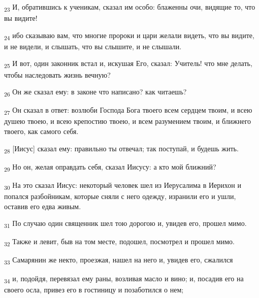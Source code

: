 \begin{tcolorbox}
\textsubscript{23} И, обратившись к ученикам, сказал им особо: блаженны очи, видящие то, что вы видите!
\end{tcolorbox}
\begin{tcolorbox}
\textsubscript{24} ибо сказываю вам, что многие пророки и цари желали видеть, что вы видите, и не видели, и слышать, что вы слышите, и не слышали.
\end{tcolorbox}
\begin{tcolorbox}
\textsubscript{25} И вот, один законник встал и, искушая Его, сказал: Учитель! что мне делать, чтобы наследовать жизнь вечную?
\end{tcolorbox}
\begin{tcolorbox}
\textsubscript{26} Он же сказал ему: в законе что написано? как читаешь?
\end{tcolorbox}
\begin{tcolorbox}
\textsubscript{27} Он сказал в ответ: возлюби Господа Бога твоего всем сердцем твоим, и всею душею твоею, и всею крепостию твоею, и всем разумением твоим, и ближнего твоего, как самого себя.
\end{tcolorbox}
\begin{tcolorbox}
\textsubscript{28} [Иисус] сказал ему: правильно ты отвечал; так поступай, и будешь жить.
\end{tcolorbox}
\begin{tcolorbox}
\textsubscript{29} Но он, желая оправдать себя, сказал Иисусу: а кто мой ближний?
\end{tcolorbox}
\begin{tcolorbox}
\textsubscript{30} На это сказал Иисус: некоторый человек шел из Иерусалима в Иерихон и попался разбойникам, которые сняли с него одежду, изранили его и ушли, оставив его едва живым.
\end{tcolorbox}
\begin{tcolorbox}
\textsubscript{31} По случаю один священник шел тою дорогою и, увидев его, прошел мимо.
\end{tcolorbox}
\begin{tcolorbox}
\textsubscript{32} Также и левит, быв на том месте, подошел, посмотрел и прошел мимо.
\end{tcolorbox}
\begin{tcolorbox}
\textsubscript{33} Самарянин же некто, проезжая, нашел на него и, увидев его, сжалился
\end{tcolorbox}
\begin{tcolorbox}
\textsubscript{34} и, подойдя, перевязал ему раны, возливая масло и вино; и, посадив его на своего осла, привез его в гостиницу и позаботился о нем;
\end{tcolorbox}
